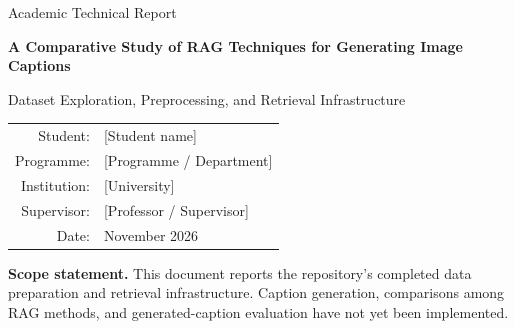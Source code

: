 \documentclass[12pt,a4paper,oneside]{report}
\begin{document}
\begin{titlepage}\centering\vspace*{22mm}
{\Large Academic Technical Report\par}\vspace{18mm}
{\huge\bfseries A Comparative Study of RAG Techniques for Generating Image Captions\par}\vspace{12mm}
{\Large Dataset Exploration, Preprocessing, and Retrieval Infrastructure\par}\vspace{24mm}
\begin{tabular}{rl}Student: & [Student name]\\Programme: & [Programme / Department]\\Institution: & [University]\\Supervisor: & [Professor / Supervisor]\\Date: & November 2026\end{tabular}
\vfill\begin{minipage}{0.88\textwidth}\small\textbf{Scope statement.} This document reports the repository's completed data preparation and retrieval infrastructure. Caption generation, comparisons among RAG methods, and generated-caption evaluation have not yet been implemented.\end{minipage}\vspace{15mm}\end{titlepage}
\tableofcontents\listoffigures\listoftables\clearpage{}
\end{document}
